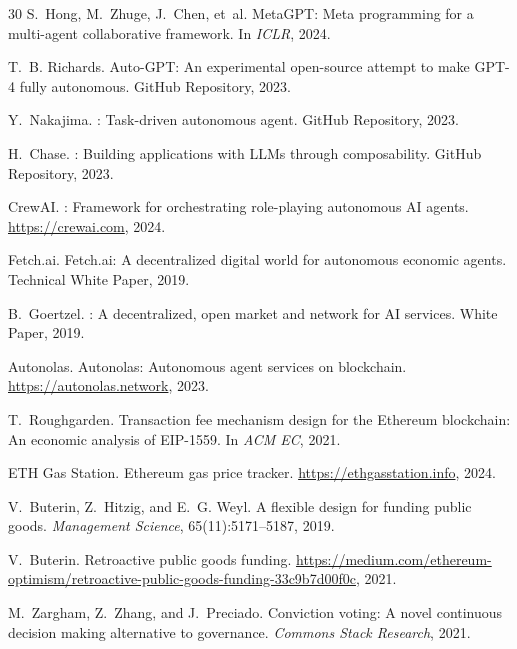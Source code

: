\documentclass[conference]{IEEEtran}
\begin{document}
\begin{thebibliography}{30}
S.~Hong, M.~Zhuge, J.~Chen, et~al.
\newblock Meta{GPT}: Meta programming for a multi-agent collaborative framework.
\newblock In \emph{ICLR}, 2024.

T.~B. Richards.
\newblock Auto-{GPT}: An experimental open-source attempt to make {GPT}-4 fully autonomous.
\newblock GitHub Repository, 2023.

Y.~Nakajima.
: Task-driven autonomous agent.
\newblock GitHub Repository, 2023.

H.~Chase.
: Building applications with {LLMs} through composability.
\newblock GitHub Repository, 2023.

CrewAI.
: Framework for orchestrating role-playing autonomous {AI} agents.
\newblock \url{https://crewai.com}, 2024.

Fetch.ai.
\newblock Fetch.ai: A decentralized digital world for autonomous economic agents.
\newblock Technical White Paper, 2019.

B.~Goertzel.
: A decentralized, open market and network for {AI} services.
\newblock White Paper, 2019.

Autonolas.
\newblock Autonolas: Autonomous agent services on blockchain.
\newblock \url{https://autonolas.network}, 2023.

T.~Roughgarden.
\newblock Transaction fee mechanism design for the {E}thereum blockchain: An economic analysis of {EIP}-1559.
\newblock In \emph{ACM EC}, 2021.

ETH Gas Station.
\newblock Ethereum gas price tracker.
\newblock \url{https://ethgasstation.info}, 2024.

V.~Buterin, Z.~Hitzig, and E.~G. Weyl.
\newblock A flexible design for funding public goods.
\newblock \emph{Management Science}, 65(11):5171--5187, 2019.

V.~Buterin.
\newblock Retroactive public goods funding.
\newblock \url{https://medium.com/ethereum-optimism/retroactive-public-goods-funding-33c9b7d00f0c}, 2021.

M.~Zargham, Z.~Zhang, and J.~Preciado.
\newblock Conviction voting: A novel continuous decision making alternative to governance.
\newblock \emph{Commons Stack Research}, 2021.


\end{thebibliography}
\end{document}
